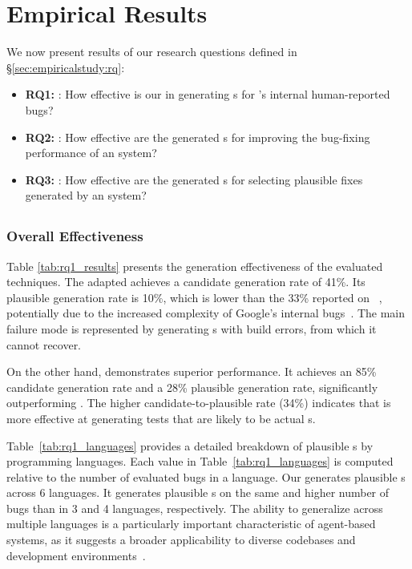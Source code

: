 \section{Empirical Results}
\label{sec:results}
We now present results of our research questions defined in \S\ref{sec:empiricalstudy:rq}:
\begin{itemize}
    \item \textbf{RQ1: \rqonetitle}: How effective is our \tool in generating \brt{}s for \google's internal human-reported bugs?
    \item \textbf{RQ2: \rqtwotitle}: How effective are the generated \brt{}s for improving the bug-fixing performance of an \autopr system?
    \item \textbf{RQ3: \rqthreetitle}: How effective are the generated \brt{}s for selecting plausible fixes generated by an \autopr system?
\end{itemize}

\subsection{\rqonetitle{}}
\label{sec:results:brt}


\subsubsection{Overall Effectiveness}
Table \ref{tab:rq1_results} presents the \brt generation effectiveness of the evaluated techniques.  
The adapted \libro achieves a candidate \brt generation rate of 41\%. Its plausible \brt generation rate is 10\%, which is lower than the 33\% reported on ~\cite{kang2023large}, potentially due to the increased complexity of Google's internal bugs~\cite{rondon2025passerine}. 
The main failure mode is represented by \libro generating \brt{}s with build errors, from which it cannot recover.

On the other hand, \tool demonstrates superior performance. 
It achieves an 85\% candidate \brt generation rate and a 28\% plausible \brt generation rate, significantly outperforming \libro. 
The higher candidate-to-plausible \brt rate (34\%) indicates that \tool is more effective at generating tests that are likely to be actual \brt{}s.

Table~\ref{tab:rq1_languages} provides a detailed breakdown of plausible \brt{}s by programming languages.
Each value in Table~\ref{tab:rq1_languages} is computed relative to the number of evaluated bugs in a language.
Our \tool generates plausible \brt{}s across 6 languages.
It generates plausible \brt{}s on the same and higher number of bugs than \libro in 3 and 4 languages, respectively.
The ability to generalize across multiple languages is a particularly important characteristic of agent-based systems, as it suggests a broader applicability to diverse codebases and development environments~\cite{yang2024swebenchmultimodalaisystems}.


